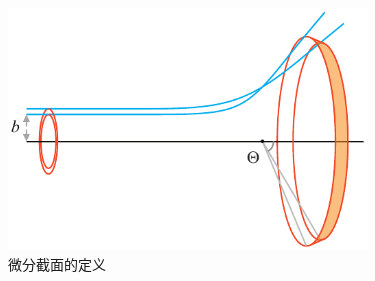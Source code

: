 

\begin{figure}[ht]
\centering
\includegraphics[width=9.5cm]{./figures/Scater1.pdf}
\caption{微分截面的定义} \label{Scater_fig1}
\end{figure}